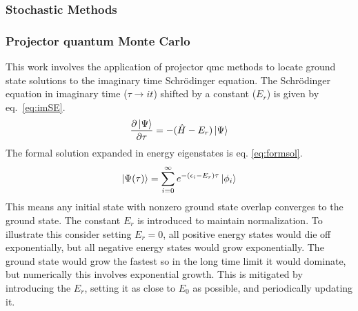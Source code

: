 \subsubsection{Stochastic Methods}

\subsubsection{Projector quantum Monte Carlo}
This work involves the application of projector \gls{qmc} methods to locate ground state solutions to the imaginary time Schr{\"o}dinger equation.
The Schr{\"o}dinger equation in imaginary time ($\tau\rightarrow it$) shifted by a constant ($E_r$) is given by eq.~\ref{eq:imSE}.
\begin{equation}
\frac{\partial \ket{\Psi}}{\partial \tau} = - (\hat{H} - E_r) \ket{\Psi}
    \label{eq:imSE}
\end{equation}
The formal solution expanded in energy eigenstates is eq. \ref{eq:formsol}.
\begin{equation}
\ket{\Psi(\tau)} = \sum_{i=0}^{\infty} e^{-(\epsilon_i - E_r) \tau} \ket{\phi_i}
    \label{eq:formsol}
\end{equation}
This means any initial state with nonzero ground state overlap converges to the ground state.
The constant $E_r$ is introduced to maintain normalization. 
To illustrate this consider setting $E_r = 0$, all positive energy states would die off exponentially, but all negative energy states would grow exponentially.
The ground state would grow the fastest so in the long time limit it would dominate, but numerically this involves exponential growth.
This is mitigated by introducing the $E_r$, setting it as close to $E_0$ as possible, and periodically updating it.

